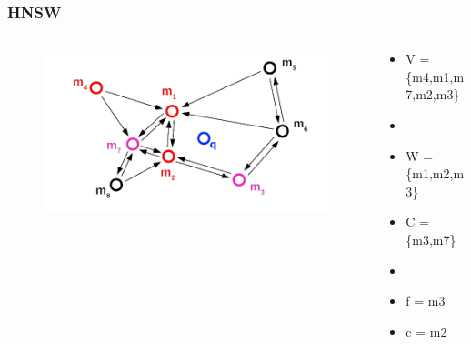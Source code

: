 \documentclass{beamer}
\begin{document}
	\begin{frame}
		\frametitle{HNSW}
		\begin{columns}[T] %
			\begin{column}{.6\textwidth}
				\begin{figure}
					\includegraphics[scale=0.3]{figures/HNSW_b8.png}
				\end{figure}
			\end{column}%
			\hfill%
			\begin{column}{.4\textwidth}
				\begin{itemize}
					\item V = \{m4,m1,m7,m2,m3\}
					\item[]
					\item W = \{m1,m2,m3\}
					\item C = \{m3,m7\}
					\item[]
					\item f = m3
					\item c = m2
				\end{itemize}
			\end{column}%
		\end{columns}
	\end{frame}
\end{document}
